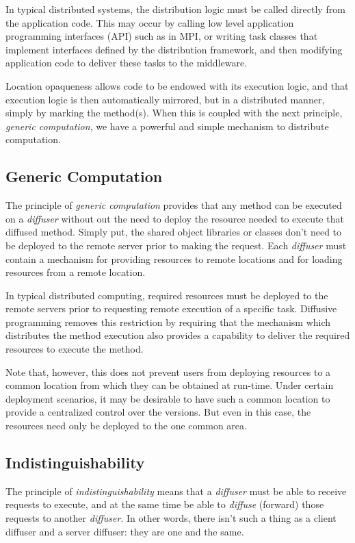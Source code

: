 \documentclass[11pt]{article}
\begin{document}
In typical distributed systems, the distribution logic must be called directly from the application code. This may occur by calling low level application programming interfaces (API) such as in MPI, or writing task classes that implement interfaces defined by the distribution framework, and then modifying application code to deliver these tasks to the middleware.

Location opaqueness allows code to be endowed with its execution logic, and that execution logic is then automatically mirrored, but in a distributed manner, simply by marking the method(s). When this is coupled with the next principle, \emph{generic computation}, we have a powerful and simple mechanism to distribute computation.

\subsection{Generic Computation\label{sec:generic_computation}}
The principle of \emph{generic computation} provides that any method can be executed on a \emph{diffuser} without out the need to deploy the resource needed to execute that diffused method. Simply put, the shared object libraries or classes don't need to be deployed to the remote server prior to making the request. Each \emph{diffuser} must contain a mechanism for providing resources to remote locations and for loading resources from a remote location.

In typical distributed computing, required resources must be deployed to the remote servers prior to requesting remote execution of a specific task. Diffusive programming removes this restriction by requiring that the mechanism which distributes the method execution also provides a capability to deliver the required resources to execute the method. 

Note that, however, this does not prevent users from deploying resources to a common location from which they can be obtained at run-time. Under certain deployment scenarios, it may be desirable to have such a common location to provide a centralized control over the versions. But even in this case, the resources need only be deployed to the one common area.

\subsection{Indistinguishability\label{sec:indistinguishability}}
The principle of \emph{indistinguishability} means that a \emph{diffuser} must be able to receive requests to execute, and at the same time be able to \emph{diffuse} (forward) those requests to another \emph{diffuser}. In other words, there isn't such a thing as a client diffuser and a server diffuser: they are one and the same.
\end{document}
